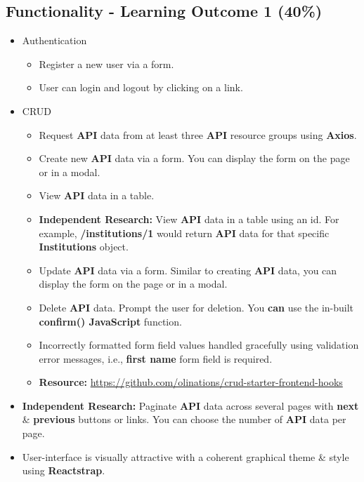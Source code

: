 \documentclass{article}
\begin{document}
\subsection*{Functionality - Learning Outcome 1 (40\%)}
\begin{itemize}
        \item Authentication
        \begin{itemize}
            \item Register a new user via a form.
            \item User can login and logout by clicking on a link. 
        \end{itemize}
        \item CRUD
        \begin{itemize}
            \item Request \textbf{API} data from at least three \textbf{API} resource groups using \textbf{Axios}.
            \item Create new \textbf{API} data via a form. You can display the form on the page or in a modal. 
            \item View \textbf{API} data in a table.
            \item \textbf{Independent Research:} View \textbf{API} data in a table using an id. For example, \textbf{/institutions/1} would return \textbf{API} data for that specific \textbf{Institutions} object.
            \item Update \textbf{API} data via a form. Similar to creating \textbf{API} data, you can display the form on the page or in a modal. 
            \item Delete \textbf{API} data. Prompt the user for deletion. You \textbf{can} use the in-built \textbf{confirm() JavaScript} function. 
            \item Incorrectly formatted form field values handled gracefully using validation error messages, i.e., \textbf{first name} form field is required.
            \item \textbf{Resource:} \small\href{https://github.com/olinations/crud-starter-frontend-hooks}{https://github.com/olinations/crud-starter-frontend-hooks}
        \end{itemize}
        \item \textbf{Independent Research:} Paginate \textbf{API} data across several pages with \textbf{next} \& \textbf{previous} buttons or links. You can choose the number of \textbf{API} data per page.
        \item User-interface is visually attractive with a coherent graphical theme \& style using \textbf{Reactstrap}.

\end{itemize}
\end{document}
